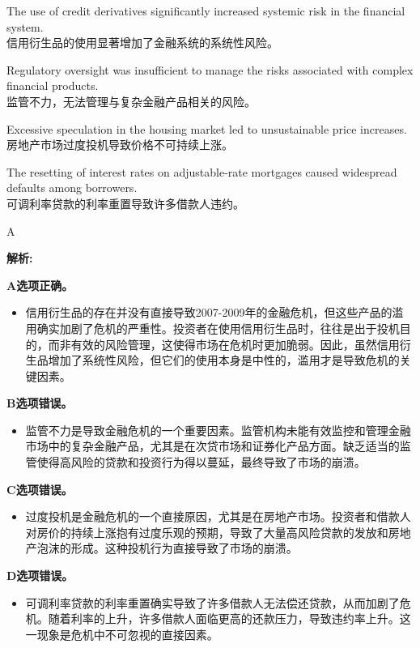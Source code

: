 \documentclass{article}
\newenvironment{explanation}
{\textbf{解析:}\par}
{\par}
\begin{document}
    \begin{choices}
        \item The use of credit derivatives significantly increased systemic risk in the financial system.\\
        信用衍生品的使用显著增加了金融系统的系统性风险。
        \item Regulatory oversight was insufficient to manage the risks associated with complex financial products.\\
        监管不力，无法管理与复杂金融产品相关的风险。
        \item Excessive speculation in the housing market led to unsustainable price increases.\\
        房地产市场过度投机导致价格不可持续上涨。
        \item The resetting of interest rates on adjustable-rate mortgages caused widespread defaults among borrowers.\\
        可调利率贷款的利率重置导致许多借款人违约。
    \end{choices}
    

    
    \begin{correctanswer}
        A
    \end{correctanswer}
    
    \begin{explanation}
        \textbf{A选项正确。}
        \begin{itemize}
            \item 信用衍生品的存在并没有直接导致2007-2009年的金融危机，但这些产品的滥用确实加剧了危机的严重性。投资者在使用信用衍生品时，往往是出于投机目的，而非有效的风险管理，这使得市场在危机时更加脆弱。因此，虽然信用衍生品增加了系统性风险，但它们的使用本身是中性的，滥用才是导致危机的关键因素。
        \end{itemize}
    
        \textbf{B选项错误。}
        \begin{itemize}
            \item 监管不力是导致金融危机的一个重要因素。监管机构未能有效监控和管理金融市场中的复杂金融产品，尤其是在次贷市场和证券化产品方面。缺乏适当的监管使得高风险的贷款和投资行为得以蔓延，最终导致了市场的崩溃。
        \end{itemize}
    
        \textbf{C选项错误。}
        \begin{itemize}
            \item 过度投机是金融危机的一个直接原因，尤其是在房地产市场。投资者和借款人对房价的持续上涨抱有过度乐观的预期，导致了大量高风险贷款的发放和房地产泡沫的形成。这种投机行为直接导致了市场的崩溃。
        \end{itemize}
    
        \textbf{D选项错误。}
        \begin{itemize}
            \item 可调利率贷款的利率重置确实导致了许多借款人无法偿还贷款，从而加剧了危机。随着利率的上升，许多借款人面临更高的还款压力，导致违约率上升。这一现象是危机中不可忽视的直接因素。
        \end{itemize}
    \end{explanation}
    
\end{document}
